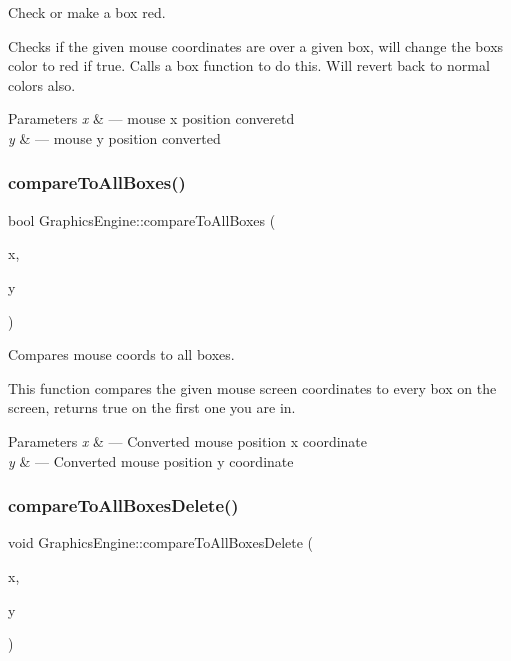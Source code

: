 Check or make a box red. 

Checks if the given mouse coordinates are over a given box, will change the box\textquotesingle{}s color to red if true. Calls a box function to do this. Will revert back to normal colors also.


\begin{DoxyParams}{Parameters}
{\em x} & --- mouse x position converetd \\
\hline
{\em y} & --- mouse y position converted \\
\hline
\end{DoxyParams}
\mbox{\label{class_graphics_engine_a4a2634a2624f603abf53b3b2746ba8c6}} 
\subsubsection{\texorpdfstring{compare\+To\+All\+Boxes()}{compareToAllBoxes()}}
{\footnotesize\ttfamily bool Graphics\+Engine\+::compare\+To\+All\+Boxes (\begin{DoxyParamCaption}\item[{G\+Lfloat}]{x,  }\item[{G\+Lfloat}]{y }\end{DoxyParamCaption})}



Compares mouse coords to all boxes. 

This function compares the given mouse screen coordinates to every box on the screen, returns true on the first one you are in.


\begin{DoxyParams}{Parameters}
{\em x} & --- Converted mouse position x coordinate \\
\hline
{\em y} & --- Converted mouse position y coordinate \\
\hline
\end{DoxyParams}
\mbox{\label{class_graphics_engine_add65dfb7d27e2aae2344240a45dd45a0}} 
\subsubsection{\texorpdfstring{compare\+To\+All\+Boxes\+Delete()}{compareToAllBoxesDelete()}}
{\footnotesize\ttfamily void Graphics\+Engine\+::compare\+To\+All\+Boxes\+Delete (\begin{DoxyParamCaption}\item[{G\+Lfloat}]{x,  }\item[{G\+Lfloat}]{y }\end{DoxyParamCaption})}



